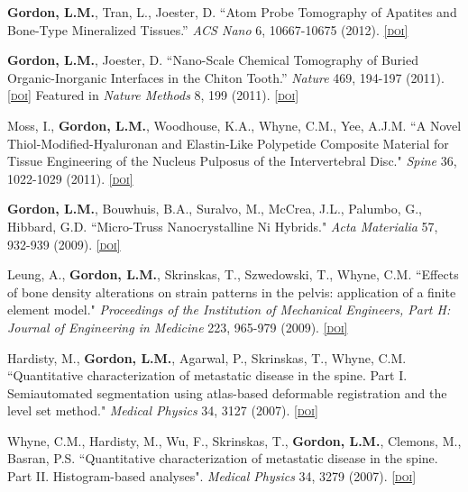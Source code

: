 \textbf{Gordon, L.M.}, Tran, L., Joester, D. “Atom Probe Tomography of Apatites and Bone-Type Mineralized Tissues.” \emph{ACS Nano} 6, 10667-10675 (2012). \href{http://dx.doi.org/10.1021/nn3049957}{\textsc{\footnotesize{[doi]}}}

\textbf{Gordon, L.M.}, Joester, D. “Nano-Scale Chemical Tomography of Buried Organic-Inorganic Interfaces in the Chiton Tooth.” \emph{Nature} 469, 194-197 (2011). \href{http://dx.doi.org/10.1038/nature09686}{\textsc{\footnotesize{[doi]}}} Featured in \emph{Nature Methods} 8, 199 (2011). \href{http://dx.doi.org/10.1038/nmeth0311-199}{\textsc{\footnotesize{[doi]}}}

Moss, I., \textbf{Gordon, L.M.}, Woodhouse, K.A., Whyne, C.M., Yee, A.J.M. ``A Novel Thiol-Modified-Hyaluronan and Elastin-Like Polypetide Composite Material for Tissue Engineering of the Nucleus Pulposus of the Intervertebral Disc." \emph{Spine} 36, 1022-1029 (2011). \href{http://dx.doi.org/10.1097/BRS.0b013e3181e7b705}{\textsc{\footnotesize{[doi]}}}

\textbf{Gordon, L.M.}, Bouwhuis, B.A., Suralvo, M., McCrea, J.L., Palumbo, G., Hibbard, G.D. ``Micro-Truss Nanocrystalline Ni Hybrids." \emph{Acta Materialia} 57, 932-939 (2009). \href{http://dx.doi.org/10.1016/j.actamat.2008.10.038}{\textsc{\footnotesize{[doi]}}}

Leung, A., \textbf{Gordon, L.M.}, Skrinskas, T., Szwedowski, T., Whyne, C.M. ``Effects of bone density alterations on strain patterns in the pelvis: application of a finite element model." \emph{Proceedings of the Institution of Mechanical Engineers, Part H: Journal of Engineering in Medicine} 223, 965-979 (2009). \href{http://dx.doi.org/10.1243/09544119JEIM618}{\textsc{\footnotesize{[doi]}}}

Hardisty, M., \textbf{Gordon, L.M.}, Agarwal, P., Skrinskas, T., Whyne, C.M. ``Quantitative characterization of metastatic disease in the spine. Part I. Semiautomated segmentation using atlas-based deformable registration and the level set method." \emph{Medical Physics} 34, 3127 (2007). \href{http://dx.doi.org/10.1118/1.2746498}{\textsc{\footnotesize{[doi]}}}

Whyne, C.M., Hardisty, M., Wu, F., Skrinskas, T., \textbf{Gordon, L.M.}, Clemons, M., Basran, P.S. ``Quantitative characterization of metastatic disease in the spine. Part II. Histogram-based analyses". \emph{Medical Physics} 34, 3279 (2007). \href{http://dx.doi.org/10.1118/1.2756939}{\textsc{\footnotesize{[doi]}}}
\endgroup

